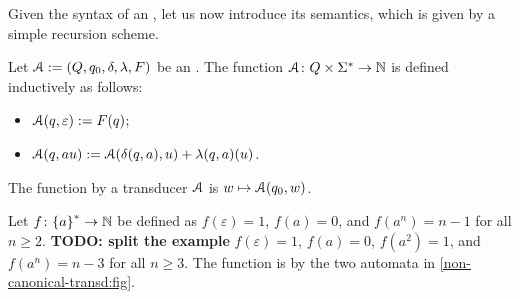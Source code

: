 Given the syntax of an , let us now 
introduce its semantics, which is given by a simple recursion
scheme.
\begin{definition}
    Let $\mathcal{A} \mathrel{:=} (Q,q_0, \delta, \lambda, F)$ be an .
    The function
    $\mathcal{A} \colon Q \times \Sigma^* \to \mathbb{N}$
    is defined inductively  as follows:
    \begin{itemize}
        \item $\mathcal{A}(q, \varepsilon) \mathrel{:=} F(q)$;
        \item $\mathcal{A}(q, a u) \mathrel{:=} \mathcal{A}(\delta(q,a), u)
            + \lambda(q,a)(u)$.
    \end{itemize}
    The function  by a transducer $\mathcal{A}$
    is $w \mapsto \mathcal{A}(q_0, w)$.
\end{definition}


\begin{example}
    \label{non-canonical-transd:ex}
    Let $f \colon \mathopen{\{} a \mathclose{\}}^* \to \mathbb{N}$
    be defined as
    $f(\varepsilon) = 1$,
    $f(a) = 0$,
    and $f(a^n) = n - 1$ for all $n \geq 2$.
    \textbf{TODO: split the example}
    $f(\varepsilon) = 1$,
    $f(a) = 0$,
    $f(a^2) = 1$,
    and $f(a^n) = n - 3$ for all $n \geq 3$.
    The function is  by the two automata
    in \cref{non-canonical-transd:fig}.
\end{example}

